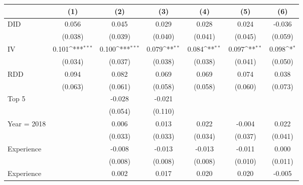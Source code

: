 {
\def\sym#1{\ifmmode^{#1}\else\(^{#1}\)\fi}
\begin{tabular}{l*{6}{c}}
\hline\hline
                &\multicolumn{1}{c}{(1)}         &\multicolumn{1}{c}{(2)}         &\multicolumn{1}{c}{(3)}         &\multicolumn{1}{c}{(4)}         &\multicolumn{1}{c}{(5)}         &\multicolumn{1}{c}{(6)}         \\
\hline
DID             &    0.056         &    0.045         &    0.029         &    0.028         &    0.024         &   -0.036         \\
                &  (0.038)         &  (0.039)         &  (0.040)         &  (0.041)         &  (0.045)         &  (0.059)         \\
IV              &    0.101\sym{***}&    0.100\sym{***}&    0.079\sym{**} &    0.084\sym{**} &    0.097\sym{**} &    0.098\sym{*}  \\
                &  (0.034)         &  (0.037)         &  (0.038)         &  (0.038)         &  (0.041)         &  (0.050)         \\
RDD             &    0.094         &    0.082         &    0.069         &    0.069         &    0.074         &    0.038         \\
                &  (0.063)         &  (0.061)         &  (0.058)         &  (0.058)         &  (0.060)         &  (0.073)         \\
Top 5           &                  &   -0.028         &   -0.021         &                  &                  &                  \\
                &                  &  (0.054)         &  (0.110)         &                  &                  &                  \\
Year = 2018     &                  &    0.006         &    0.013         &    0.022         &   -0.004         &    0.022         \\
                &                  &  (0.033)         &  (0.033)         &  (0.034)         &  (0.037)         &  (0.041)         \\
Experience      &                  &   -0.008         &   -0.013         &   -0.013         &   -0.011         &    0.000         \\
                &                  &  (0.008)         &  (0.008)         &  (0.008)         &  (0.010)         &  (0.011)         \\
Experience      &                  &    0.002         &    0.017         &    0.020         &    0.020         &   -0.005         \\

\end{tabular}}
